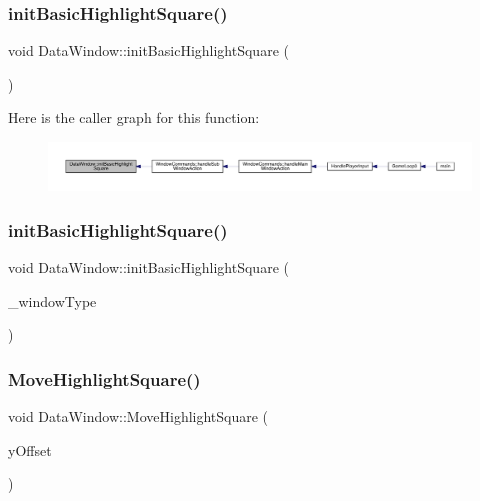 \subsubsection{\texorpdfstring{init\+Basic\+Highlight\+Square()}{initBasicHighlightSquare()}\hspace{0.1cm}{\footnotesize\ttfamily [1/2]}}
{\footnotesize\ttfamily void Data\+Window\+::init\+Basic\+Highlight\+Square (\begin{DoxyParamCaption}{ }\end{DoxyParamCaption})}

Here is the caller graph for this function\+:
\nopagebreak
\begin{figure}[H]
\begin{center}
\leavevmode
\includegraphics[width=350pt]{class_data_window_afd440dc420c7fdef23a1a52f0f1b40f1_icgraph}
\end{center}
\end{figure}
\mbox{\label{class_data_window_a1b1968cd0cbaaddcae7651e57f795e0c}} 
\subsubsection{\texorpdfstring{init\+Basic\+Highlight\+Square()}{initBasicHighlightSquare()}\hspace{0.1cm}{\footnotesize\ttfamily [2/2]}}
{\footnotesize\ttfamily void Data\+Window\+::init\+Basic\+Highlight\+Square (\begin{DoxyParamCaption}\item[{\mbox{\hyperlink{_data_window_8hpp_a3c1e0c6fe947fdbea7502497b27cf44d}{En\+Data\+Window\+Type}}}]{\+\_\+window\+Type }\end{DoxyParamCaption})}

\mbox{\label{class_data_window_a2047f47dfa6093e3f7c4bf30cd176a46}} 
\subsubsection{\texorpdfstring{Move\+Highlight\+Square()}{MoveHighlightSquare()}}
{\footnotesize\ttfamily void Data\+Window\+::\+Move\+Highlight\+Square (\begin{DoxyParamCaption}\item[{int}]{y\+Offset }\end{DoxyParamCaption})}

